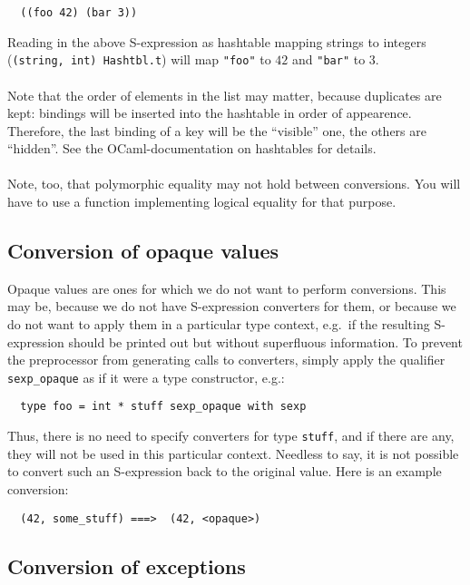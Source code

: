 \documentclass[a4paper]{article}
\begin{document}
\begin{verbatim}
  ((foo 42) (bar 3))
\end{verbatim}

Reading in the above S-expression as hashtable mapping strings to
integers (\verb=(string, int) Hashtbl.t=) will map \verb="foo"= to $42$
and \verb="bar"= to $3$.\\
\\
Note that the order of elements in the list may matter, because
duplicates are kept: bindings will be inserted into the hashtable in
order of appearence.  Therefore, the last binding of a key will be the
``visible'' one, the others are ``hidden''.  See the OCaml-documentation
on hashtables for details.\\
\\
Note, too, that polymorphic equality may not hold between conversions.
You will have to use a function implementing logical equality for that
purpose.

\subsection{Conversion of opaque values}

Opaque values are ones for which we do not want to perform conversions.
This may be, because we do not have S-expression converters for them,
or because we do not want to apply them in a particular type context,
e.g.\ if the resulting S-expression should be printed out but without
superfluous information.  To prevent the preprocessor from generating
calls to converters, simply apply the qualifier \verb=sexp_opaque=
as if it were a type constructor, e.g.:

\begin{verbatim}
  type foo = int * stuff sexp_opaque with sexp
\end{verbatim}

Thus, there is no need to specify converters for type \verb=stuff=,
and if there are any, they will not be used in this particular context.
Needless to say, it is not possible to convert such an S-expression back
to the original value.  Here is an example conversion:

\begin{verbatim}
  (42, some_stuff) ===>  (42, <opaque>)
\end{verbatim}

\subsection{Conversion of exceptions}
\end{document}
